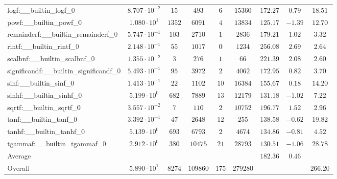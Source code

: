 \begin{tabular}{|l|c|c|c|c|c|c|c|c|}
logf:\_\_builtin\_logf\_0                 & $ 8.707 \cdot 10^{-2} $ & $ 15     $ & $ 493    $ & $ 6   $ & $ 15360  $ & $ 172.27      $ & $ 0.79    $ & $ 18.51   $ \\
powf:\_\_builtin\_powf\_0                 & $ 1.080 \cdot 10^{1}  $ & $ 1352   $ & $ 6091   $ & $ 4   $ & $ 13834  $ & $ 125.17      $ & $ -1.39   $ & $ 12.70   $ \\
remainderf:\_\_builtin\_remainderf\_0     & $ 5.747 \cdot 10^{-1} $ & $ 103    $ & $ 2710   $ & $ 1   $ & $ 2836   $ & $ 179.21      $ & $ 1.02    $ & $ 3.32    $ \\
rintf:\_\_builtin\_rintf\_0               & $ 2.148 \cdot 10^{-1} $ & $ 55     $ & $ 1017   $ & $ 0   $ & $ 1234   $ & $ 256.08      $ & $ 2.69    $ & $ 2.64    $ \\
scalbnf:\_\_builtin\_scalbnf\_0           & $ 1.355 \cdot 10^{-2} $ & $ 3      $ & $ 276    $ & $ 1   $ & $ 66     $ & $ 221.39      $ & $ 2.08    $ & $ 2.60    $ \\
significandf:\_\_builtin\_significandf\_0 & $ 5.493 \cdot 10^{-1} $ & $ 95     $ & $ 3972   $ & $ 2   $ & $ 4062   $ & $ 172.95      $ & $ 0.82    $ & $ 3.70    $ \\
sinf:\_\_builtin\_sinf\_0                 & $ 1.413 \cdot 10^{-1} $ & $ 22     $ & $ 1102   $ & $ 10  $ & $ 16384  $ & $ 155.67      $ & $ 0.18    $ & $ 14.20   $ \\
sinhf:\_\_builtin\_sinhf\_0               & $ 5.199 \cdot 10^{0}  $ & $ 682    $ & $ 7889   $ & $ 13  $ & $ 12179  $ & $ 131.18      $ & $ -1.02   $ & $ 7.22    $ \\
sqrtf:\_\_builtin\_sqrtf\_0               & $ 3.557 \cdot 10^{-2} $ & $ 7      $ & $ 110    $ & $ 2   $ & $ 10752  $ & $ 196.77      $ & $ 1.52    $ & $ 2.96    $ \\
tanf:\_\_builtin\_tanf\_0                 & $ 3.392 \cdot 10^{-1} $ & $ 47     $ & $ 2648   $ & $ 12  $ & $ 255    $ & $ 138.58      $ & $ -0.62   $ & $ 19.82   $ \\
tanhf:\_\_builtin\_tanhf\_0               & $ 5.139 \cdot 10^{0}  $ & $ 693    $ & $ 6793   $ & $ 2   $ & $ 4674   $ & $ 134.86      $ & $ -0.81   $ & $ 4.52    $ \\
tgammaf:\_\_builtin\_tgammaf\_0           & $ 2.912 \cdot 10^{0}  $ & $ 380    $ & $ 10475  $ & $ 21  $ & $ 28793  $ & $ 130.51      $ & $ -1.06   $ & $ 28.78   $ \\
\hline
Average                                   & $                     $ & $        $ & $        $ & $     $ & $        $ & $ 182.36      $ & $ 0.46    $ & $         $ \\
\hline
Overall                                   & $ 5.890 \cdot 10^{1}  $ & $ 8274   $ & $ 109860 $ & $ 175 $ & $ 279280 $ & $             $ & $         $ & $ 266.20  $ \\
\hline
\end{tabular}
